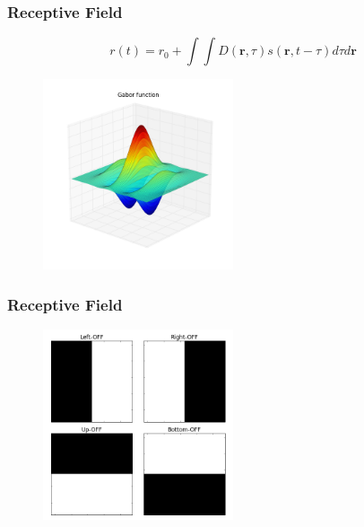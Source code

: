 \documentclass{beamer}
\begin{document}
\begin{frame}
 \frametitle{Receptive Field}


\begin{equation}
r(t) = r_0 + \displaystyle \int \int D(\mathbf{r},\tau) s(\mathbf{r},t-\tau) d\tau d\mathbf{r}
\end{equation}


\begin{figure}
 \includegraphics[width = 0.5\textwidth]{figures/gabor.png}
 \end{figure}

\end{frame}


\begin{frame}
 \frametitle{Receptive Field}

\begin{figure}
 \includegraphics[width = 0.5\textwidth]{figures/recRFs.png}
 \end{figure}

\end{frame}
\end{document}
